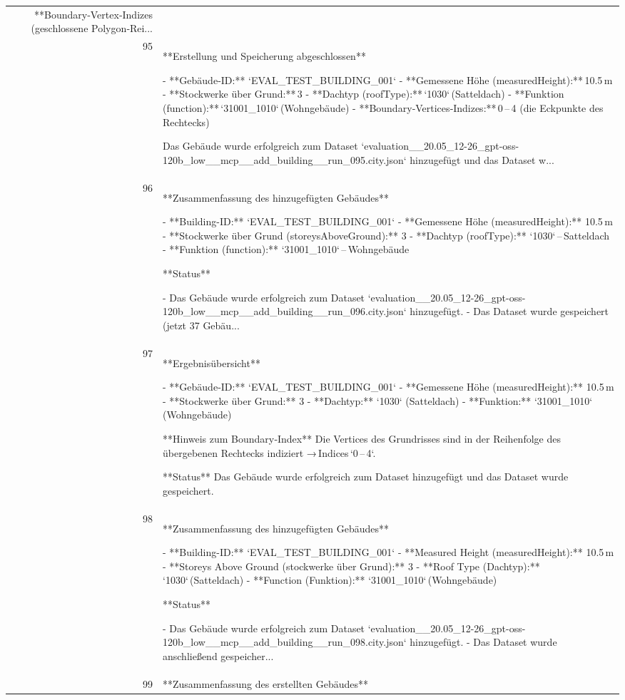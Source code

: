 \documentclass[a4paper,11pt]{article}
\begin{document}
\begin{table}[ht]
\begin{tabular}{r p{12cm}}
**Boundary‑Vertex‑Indizes (geschlossene Polygon‑Rei... \\
95 & **Erstellung und Speicherung abgeschlossen**

- **Gebäude‑ID:** `EVAL\_TEST\_BUILDING\_001`  
- **Gemessene Höhe (measuredHeight):** 10.5 m  
- **Stockwerke über Grund:** 3  
- **Dachtyp (roofType):** `1030` (Satteldach)  
- **Funktion (function):** `31001\_1010` (Wohngebäude)  
- **Boundary‑Vertices‑Indizes:** 0 – 4 (die Eckpunkte des Rechtecks)  

Das Gebäude wurde erfolgreich zum Dataset `evaluation\_\_20.05\_12-26\_gpt-oss-120b\_low\_\_mcp\_\_add\_building\_\_run\_095.city.json` hinzugefügt und das Dataset w... \\
96 & **Zusammenfassung des hinzugefügten Gebäudes**

- **Building-ID:** `EVAL\_TEST\_BUILDING\_001`  
- **Gemessene Höhe (measuredHeight):** 10.5 m  
- **Stockwerke über Grund (storeysAboveGround):** 3  
- **Dachtyp (roofType):** `1030` – Satteldach  
- **Funktion (function):** `31001\_1010` – Wohngebäude  

**Status**

- Das Gebäude wurde erfolgreich zum Dataset `evaluation\_\_20.05\_12-26\_gpt-oss-120b\_low\_\_mcp\_\_add\_building\_\_run\_096.city.json` hinzugefügt.  
- Das Dataset wurde gespeichert (jetzt 37 Gebäu... \\
97 & **Ergebnisübersicht**

- **Gebäude‑ID:** `EVAL\_TEST\_BUILDING\_001`  
- **Gemessene Höhe (measuredHeight):** 10.5 m  
- **Stockwerke über Grund:** 3  
- **Dachtyp:** `1030` (Satteldach)  
- **Funktion:** `31001\_1010` (Wohngebäude)  

**Hinweis zum Boundary‑Index**  
Die Vertices des Grundrisses sind in der Reihenfolge des übergebenen Rechtecks indiziert → Indices `0 – 4`.  

**Status**  
Das Gebäude wurde erfolgreich zum Dataset hinzugefügt und das Dataset wurde gespeichert. \\
98 & **Zusammenfassung des hinzugefügten Gebäudes**

- **Building-ID:** `EVAL\_TEST\_BUILDING\_001`  
- **Measured Height (measuredHeight):** 10.5 m  
- **Storeys Above Ground (stockwerke über Grund):** 3  
- **Roof Type (Dachtyp):** `1030` (Satteldach)  
- **Function (Funktion):** `31001\_1010` (Wohngebäude)  

**Status**

- Das Gebäude wurde erfolgreich zum Dataset `evaluation\_\_20.05\_12-26\_gpt-oss-120b\_low\_\_mcp\_\_add\_building\_\_run\_098.city.json` hinzugefügt.  
- Das Dataset wurde anschließend gespeicher... \\
99 & **Zusammenfassung des erstellten Gebäudes**


\end{tabular}
\end{table}
\end{document}
